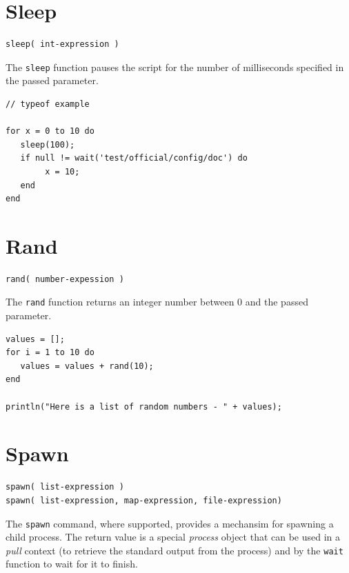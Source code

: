\section{Sleep}

\begin{verbatim}
sleep( int-expression )
\end{verbatim}

The \verb+sleep+ function pauses the \Reflex script for the number of milliseconds specified in the passed parameter.

\begin{lstlisting}[caption={Sleep example}]
// typeof example

for x = 0 to 10 do
   sleep(100);
   if null != wait('test/official/config/doc') do
        x = 10;
   end
end

\end{lstlisting}

\section{Rand}

\begin{verbatim}
rand( number-expession )
\end{verbatim}

The \verb+rand+ function returns an integer number between 0 and the passed parameter.

\begin{lstlisting}[caption={Rand example}]
values = [];
for i = 1 to 10 do
   values = values + rand(10);
end

println("Here is a list of random numbers - " + values);

\end{lstlisting}

\section{Spawn}

\begin{verbatim}
spawn( list-expression )
spawn( list-expression, map-expression, file-expression) 
\end{verbatim}

The \verb+spawn+ command, where supported, provides a mechansim for spawning a child process. The return value is a special \emph{process} object that can be used in a \emph{pull} context (to retrieve the standard output from the process) and by the \verb+wait+ function to wait for it to finish.

